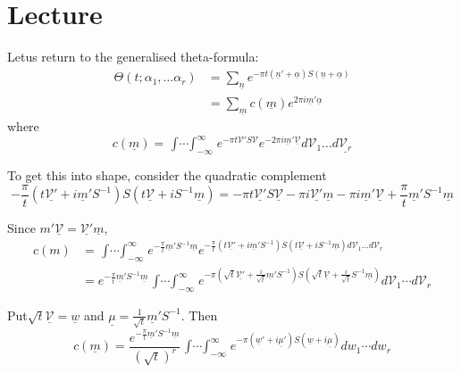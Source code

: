 \chapter{Lecture}\label{part4:lec43} %

Let\pageoriginale us return to the generalised theta-formula:
\begin{align*}
  \Theta (t; \alpha_1, \ldots \alpha_r) & = \sum_{\underline{n}} e^{-
    \pi t (\underline{n}' +\underline{\alpha})S (\underline{n} +
    \underline{\alpha})}\\
  & = \sum_{\underline{m}} c(\underline{m}) e^{2 \pi i \underline{m}' \underline{\alpha}}
\end{align*}
where
$$
c(\underline{m}) = \mathop{\int\cdots\int}_{- \infty}^\infty e^{- \pi
  t \mathscr{V}' S \mathscr{V}} e^{-2 \pi i
  \underline{m}'\underline{\mathscr{V}}} d \mathscr{V}_1 \ldots d
\underline{\mathscr{V}_r}  
$$

To get this into shape, consider the quadratic complement 
$$
- \frac{\pi}{t} (t \underline{\mathscr{V}'}+ i \underline{m}' S^{-1})
S (t \underline{\mathscr{V}}+ i S^{-1}\underline{m}) =- \pi t
\underline{\mathscr{V}'} S \underline{\mathscr{V}}- \pi i
\underline{\mathscr{V}'} \underline{m}- \pi i
\underline{m}'\underline{\mathscr{V}} + \frac{\pi}{t} \underline{m}'
S^{-1} \underline{m}  
$$

Since $m' \underline{\mathscr{V}}= \underline{\mathscr{V}'}
\underline{m}$,
\begin{align*}
  c(m) & = \mathop{\int \cdots \int}^\infty_{- \infty} e^{-
    \frac{\pi}{t} \underline{m}' S^{-1} \underline{m}} e^{-
    \frac{\pi}{t}(t \underline{\mathscr{V}'} + i\underline{m}'
    S^{-1})S (t \underline{\mathscr{V}}+ i S^{-1} \underline{m})d
    \mathscr{V}_1 \ldots d \mathscr{V}_r}\\
  & = e^{- \frac{\pi}{t}\underline{m}' S^{-1} \underline{m}}
  \mathop{\int\cdots\int}_{- \infty}^\infty e^{- \pi (\sqrt{t}
    \underline{\mathscr{V}'}+ \frac{i}{\sqrt{t}} \underline{m}'
    S^{-1}) S(\sqrt{t} \underline{\mathscr{V}} + \frac{i}{\sqrt{t}}
    S^{-1} \underline{m})} d \mathscr{V}_1 \cdots d \mathscr{V}_r 
\end{align*}

Put\pageoriginale $\sqrt{t} \underline{\mathscr{V}}= \underline{w}$
and $\underline{\mu}= \frac{1}{\sqrt{t}} \underline{m}' S^{-1}$. Then 
$$
c(\underline{m}) = \frac{e^{- \frac{\pi}{t} \underline{m}' S^{-1}
    \underline{m}}}{(\sqrt{t})^r} \mathop{\int\cdots \int}_{-
  \infty}^\infty e^{- \pi (\underline{w}' + i \underline{\mu}')
  S(\underline{w} + i \underline{\mu})} d w_1 \cdots d w_r
$$

